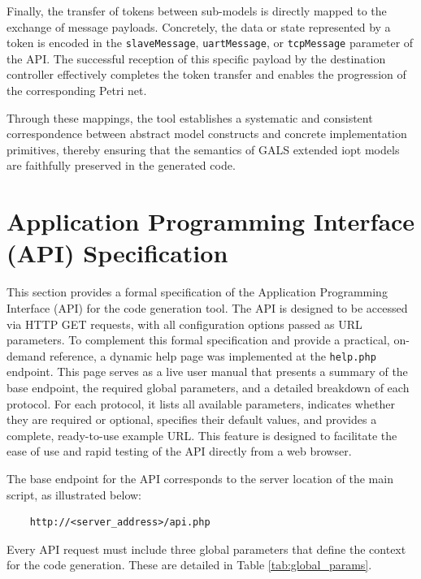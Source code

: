 Finally, the transfer of tokens between sub-models is directly mapped to the exchange of message payloads. Concretely, the data or state represented by a token is encoded in the \texttt{slaveMessage}, \texttt{uartMessage}, or \texttt{tcpMessage} parameter of the API. The successful reception of this specific payload by the destination controller effectively completes the token transfer and enables the progression of the corresponding Petri net.

Through these mappings, the tool establishes a systematic and consistent correspondence between abstract model constructs and concrete implementation primitives, thereby ensuring that the semantics of GALS extended \gls{iopt} models are faithfully preserved in the generated code.



\section{Application Programming Interface (API) Specification}
\label{sec:api_spec}

This section provides a formal specification of the Application Programming Interface (API) for the code generation tool. The API is designed to be accessed via HTTP GET requests, with all configuration options passed as URL parameters.
To complement this formal specification and provide a practical, on-demand reference, a dynamic help page was implemented at the \texttt{help.php} endpoint. This page serves as a live user manual that presents a summary of the base endpoint, the required global parameters, and a detailed breakdown of each protocol. For each protocol, it lists all available parameters, indicates whether they are required or optional, specifies their default values, and provides a complete, ready-to-use example URL. This feature is designed to facilitate the ease of use and rapid testing of the API directly from a web browser.

The base endpoint for the API corresponds to the server location of the main script, as illustrated below:
\begin{verbatim}
    http://<server_address>/api.php
\end{verbatim}

Every API request must include three global parameters that define the context for the code generation. These are detailed in Table \ref{tab:global_params}.

